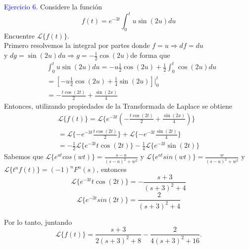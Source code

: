 \textcolor{blue}{Ejercicio 6.} Considere la función
\begin{equation}
    f(t)=e^{-3t}\int_{0}^{t}u\sin(2u)du
\end{equation}
Encuentre $\mathscr{L}\{f(t)\}$.\\

Primero resolvemos la integral por partes donde $f=u \Rightarrow df=du$ \\
y $dg=\sin(2u)du \Rightarrow g=-\frac{1}{2}\cos(2u)$de forma que
\begin{equation*}
\begin{split}
   & \int_{0}^{t}u\sin(2u)du=  -u\frac{1}{2}\cos(2u) + \frac{1}{2} \int_{0}^{t}\cos(2u) du \\
    & = \left[-u\frac{1}{2}\cos(2u) + \frac{1}{4}\sin(2u)\right]\Big|_0^t \\
    &=-\frac{t\cos(2t)}{2}+ \frac{\sin(2x)}{4}
\end{split}
\end{equation*}
Entonces, utilizando propiedades de la Transformada de Laplace se obtiene
\begin{equation*}
\begin{split}
    \mathscr{L}\{f(t)\}=\mathscr{L}\{e^{-3t}(-\frac{t\cos(2t)}{2} + \frac{\sin(2x)}{4})\}\\
    =\mathscr{L}\{-e^{-3t}\frac{t\cos(2t)}{2}\} +  \mathscr{L}\{-e^{-3t}\frac{\sin(2t)}{4}\} \\
    =-\frac{1}{2}\mathscr{L}\{e^{-3t}t\cos(2t)\} - \frac{1}{4} \mathscr{L}\{e^{-3t}\sin(2t)\}
\end{split}
\end{equation*}
Sabemos que $\mathscr{L}\{e^{at}cos(wt)\}=\frac{s-a}{(s-a)^{2}+ w^{2}}$ y  $\mathscr{L}\{e^{at}sin(wt)\}=\frac{w}{(s-a)^{2}+ w^{2}}$ y $\mathscr{L}\{t^{n}f(t)\}=(-1)^{n}F^{n}(s)$, entonces 
\begin{equation*}
    \mathscr{L}\{e^{-3t}t\cos(2t)\}= -\frac{s+3}{(s+3)^{2}+ 4}
\end{equation*}
\begin{equation*}
    \mathscr{L}\{e^{-3t}sin(2t)\}=\frac{2}{(s+3)^{2}+ 4}
\end{equation*}

Por lo tanto, juntando 
\begin{equation}
    \mathscr{L}\{f(t)\}=\frac{s+3}{2(s+3)^{2}+ 8} - \frac{2}{4(s+3)^{2}+ 16}.
\end{equation}